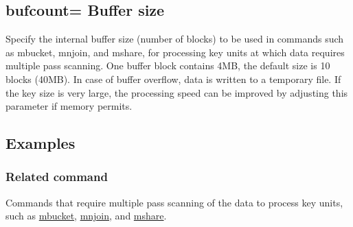 %

\subsection{bufcount= Buffer size\label{sect:option_bufcount}}

Specify the internal buffer size (number of blocks) to be used in commands such as mbucket, mnjoin, and mshare, for processing key units at which data requires multiple pass scanning. 
One buffer block contains 4MB, the default size is 10 blocks (40MB).
In case of buffer overflow, data is written to a temporary file. If the key size is very large, the processing speed can be improved by adjusting this parameter if memory permits. 

\subsection*{Examples}


\subsubsection*{Related command}
Commands that require multiple pass scanning of the data to process key units, such as \hyperref[sect:mbucket]{mbucket}, \hyperref[sect:mnjoin]{mnjoin}, and \hyperref[sect:mshare]{mshare}.

%

